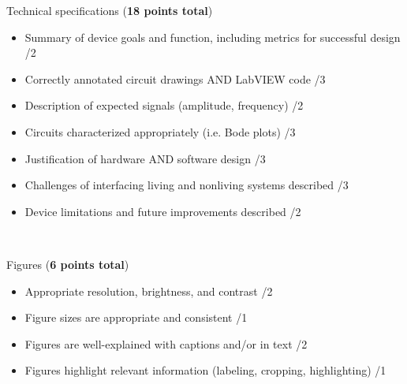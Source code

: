 \documentclass{article}
\begin{document}
Technical specifications (\textbf{18 points total})
\begin{small}
\begin{itemize}
	\item Summary of device goals and function, including metrics for successful design \hfill \underline{\hspace{1cm}}/2
	\item Correctly annotated circuit drawings AND LabVIEW code \hfill \underline{\hspace{1cm}}/3
	\item Description of expected signals (amplitude, frequency) \hfill \underline{\hspace{1cm}}/2
	\item Circuits characterized appropriately (i.e. Bode plots) \hfill \underline{\hspace{1cm}}/3
	\item Justification of hardware AND software design \hfill \underline{\hspace{1cm}}/3
	\item Challenges of interfacing living and nonliving systems described \hfill \underline{\hspace{1cm}}/3
	\item Device limitations and future improvements described \hfill \underline{\hspace{1cm}}/2
\end{itemize}
\end{small}\

Figures (\textbf{6 points total})
\begin{small}
\begin{itemize}
	\item Appropriate resolution, brightness, and contrast \hfill \underline{\hspace{1cm}}/2
	\item Figure sizes are appropriate and consistent \hfill \underline{\hspace{1cm}}/1
	\item Figures are well-explained with captions and/or in text \hfill \underline{\hspace{1cm}}/2
	\item Figures highlight relevant information (labeling, cropping, highlighting) \hfill \underline{\hspace{1cm}}/1
\end{itemize}
\end{small}\
\end{document}
